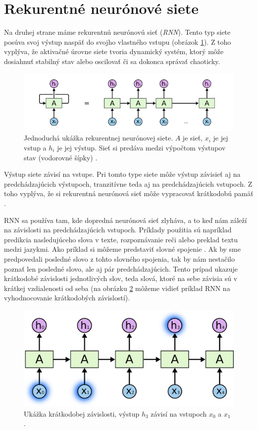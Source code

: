 \section{Rekurentné neurónové siete}
Na druhej strane máme rekurentnú neurónovú sieť (\textit{RNN}).
Tento typ siete posúva svoj výstup naspäť do svojho vlastného vstupu (obrázok \ref{rnn}). 
Z toho vyplýva, že aktivačné úrovne siete tvoria dynamický systém, ktorý môže dosiahnuť stabilný stav alebo oscilovať či sa dokonca správať chaoticky.
\begin{figure} 
\includegraphics[width=\textwidth]{../img/rnn.png}
\caption{Jednoduchá ukážka rekurentnej neurónovej siete. $A$ je sieť, $x_i$ je jej vstup a $h_i$ je jej výstup. Sieť si predáva medzi výpočtom výstupov stav (vodorovné šípky) \citep{rnn:colah}.}
\label{rnn}
\end{figure}

Výstup siete závisí na vstupe. 
Pri tomto type siete môže výstup závisieť aj na predchádzajúcich výstupoch, tranzitívne teda aj na predchádzajúcich vstupoch.
Z toho vyplýva, že si rekurentná neurónová sieť môže vypracovať krátkodobú pamäť \citep{aima}.

RNN sa používa tam, kde dopredná neurónová sieť zlyháva, a to keď nám záleží na závislosti na predchádzajúcich vstupoch. 
Príklady použitia sú napríklad predikcia nasledujúceho slova v texte, rozpoznávanie reči alebo preklad textu medzi jazykmi.
Ako príklad si môžeme predstaviť slovné spojenie . 
Ak by sme predpovedali posledné slovo z tohto slovného spojenia, tak by nám nestačilo poznať len posledné slovo, ale aj pár predchádzajúcich. 
Tento prípad ukazuje krátkodobé závislosti jednotlivých slov, teda slová, ktoré na sebe závisia sú v krátkej vzdialenosti od seba (na obrázku \ref{rnn:std} môžeme vidieť príklad RNN na vyhodnocovanie krátkodobých závislostí).
\begin{figure}  [h!]
\includegraphics[width=\textwidth]{../img/rnn-std.png}
\caption{Ukážka krátkodobej závislosti, výstup $h_3$ závisí na vstupoch $x_0$ a $x_1$ \citep{rnn:colah}.}
\label{rnn:std}
\end{figure}

